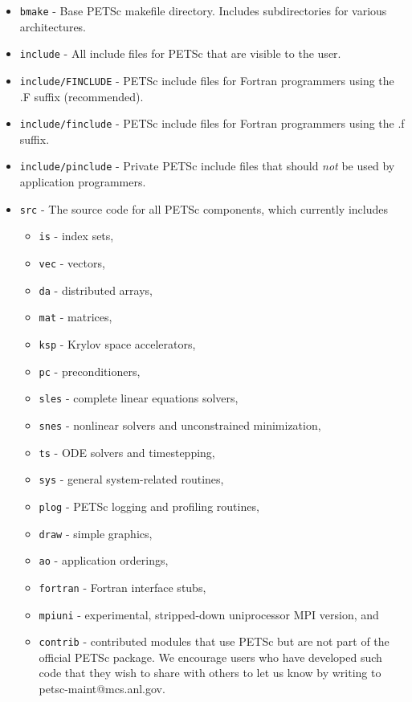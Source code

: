 {\begin{itemize}
Note that {\tt petscview}, {\tt petscopts}, and {\tt petscdemo} use Tcl/Tk.
\item {\tt bmake} - Base PETSc makefile directory.  Includes subdirectories
                    for various architectures.
\item {\tt include} - All include files for PETSc that are visible to the user.
\item {\tt include/FINCLUDE} - PETSc include files for Fortran programmers using 
                               the .F suffix (recommended).
\item {\tt include/finclude} - PETSc include files for Fortran programmers using 
                               the .f suffix.
\item {\tt include/pinclude} - Private PETSc include files that should {\em not} be used by application programmers.
\item {\tt src} - The source code for all PETSc components, which
                  currently includes
 \begin{itemize}
 \item {\tt is} - index sets,
 \item {\tt vec} - vectors,
 \item {\tt da} - distributed arrays,
 \item {\tt mat} - matrices,
 \item {\tt ksp} - Krylov space accelerators,
 \item {\tt pc} - preconditioners,
 \item {\tt sles} - complete linear equations solvers,
 \item {\tt snes} - nonlinear solvers and unconstrained minimization,
 \item {\tt ts} - ODE solvers and timestepping,
 \item {\tt sys} - general system-related routines,
 \item {\tt plog} - PETSc logging and profiling routines,
 \item {\tt draw} - simple graphics,
 \item {\tt ao} - application orderings,
 \item {\tt fortran} - Fortran interface stubs,
 \item {\tt mpiuni} - experimental, stripped-down uniprocessor MPI version, and
 \item {\tt contrib} - contributed modules that use PETSc but are not
    part of the official PETSc package.  We encourage users who have
    developed such code that they wish to share with others to let us
    know by writing to petsc-maint@mcs.anl.gov.
 \end{itemize}
\end{itemize}

}
